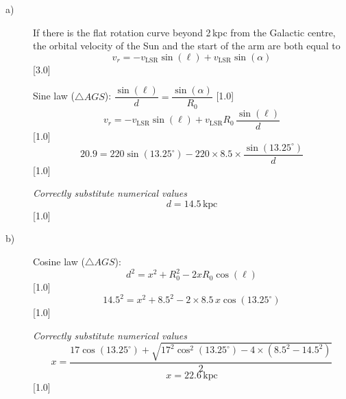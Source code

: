 \begin{description}
\item[a)]
  If there is the flat rotation curve beyond 2\,kpc from the Galactic centre,
  the orbital velocity of the Sun and the start of the arm are both equal to
  \[
    v_r = -v_{\mathrm{LSR}}\sin(\ell) + v_{\mathrm{LSR}}\sin(\alpha)
  \]
  \hfill[3.0]

  Sine law ($\triangle AGS$):\quad
  $\dfrac{\sin(\ell)}{d} = \dfrac{\sin(\alpha)}{R_0}$ \hfill[1.0]
  \[
    v_r = -v_{\mathrm{LSR}}\sin(\ell) + v_{\mathrm{LSR}}R_0\,\frac{\sin(\ell)}{d}
  \]
  \hfill[1.0]
  \[
    20.9 = 220\sin(13.25^\circ) - 220\times8.5\times\frac{\sin(13.25^\circ)}{d}
  \]
  \hfill[1.0]

  \emph{Correctly substitute numerical values}
  \[
    d = 14.5\,\mathrm{kpc}
  \]
  \hfill[1.0]
\item[b)]
  Cosine law ($\triangle AGS$):
  \[
    d^2 = x^2 + R_0^2 - 2xR_0\cos(\ell)
  \]
  \hfill[1.0]
  \[
    14.5^2 = x^2 + 8.5^2 - 2\times8.5\,x\cos(13.25^\circ)
  \]
  \hfill[1.0]

  \emph{Correctly substitute numerical values}
  \[
    x = \frac{17\cos(13.25^\circ)
        + \sqrt{17^2\cos^2(13.25^\circ) - 4\times(8.5^2 - 14.5^2)}}{2}
  \]
  \[
    x = 22.6\,\mathrm{kpc}
  \]
  \hfill[1.0]
\end{description}
